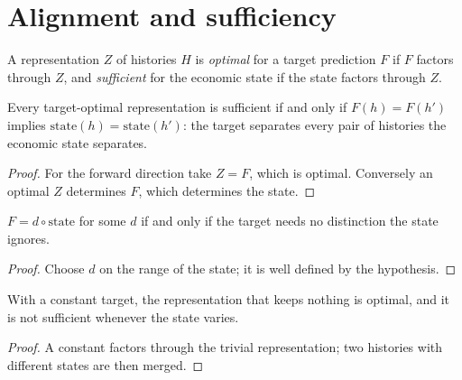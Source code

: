 \section{Alignment and sufficiency}\label{sec:bp-alignment}

\begin{definition}\label{def:alignment}
  \leanok
  A representation $Z$ of histories $H$ is \emph{optimal} for a target
  prediction $F$ if $F$ factors through $Z$, and \emph{sufficient} for the
  economic state if the state factors through $Z$.
\end{definition}

\begin{theorem}\label{thm:alignment-iff}
  \leanok
  Every target-optimal representation is sufficient if and only if
  $F(h)=F(h')$ implies $\mathrm{state}(h)=\mathrm{state}(h')$: the target
  separates every pair of histories the economic state separates.
\end{theorem}
\begin{proof}\leanok
  For the forward direction take $Z=F$, which is optimal. Conversely an optimal
  $Z$ determines $F$, which determines the state.
\end{proof}

\begin{lemma}\label{thm:alignment-state}
  \leanok
  $F=d\circ\mathrm{state}$ for some $d$ if and only if the target needs no
  distinction the state ignores.
\end{lemma}
\begin{proof}\leanok
  Choose $d$ on the range of the state; it is well defined by the hypothesis.
\end{proof}

\begin{lemma}\label{thm:alignment-null}
  \leanok
  With a constant target, the representation that keeps nothing is optimal,
  and it is not sufficient whenever the state varies.
\end{lemma}
\begin{proof}\leanok
  A constant factors through the trivial representation; two histories with
  different states are then merged.
\end{proof}

